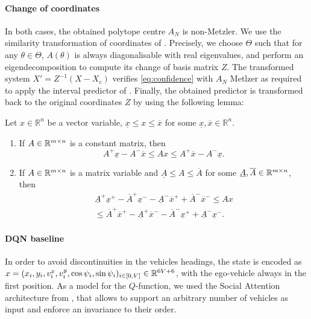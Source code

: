 \documentclass{article}
\begin{document}
\paragraph{Change of coordinates}
In both cases, the obtained polytope centre $A_N$ is non-Metzler.
We use the similarity transformation of coordinates of \citet{Efimov2013}. Precisely, we choose $\Theta$ such that for any $\theta\in\Theta$, $A(\theta)$ is always diagonalisable with real eigenvalues, and perform an eigendecomposition to compute its change of basis matrix $Z$. The transformed system $X'=Z^{-1}(X-X_c)$ verifies \eqref{eq:confidence} with $A_N$ Metlzer as required to apply the interval predictor of . Finally, the obtained predictor is transformed back to the original coordinates $Z$ by using the following lemma:
\begin{lemma}
	\label{lem:interval} Let $x\in\mathbb{R}^{n}$ be a vector variable, $\underline{x}\le x\le\overline{x}$ for some $\underline{x},\overline{x}\in\mathbb{R}^{n}$. 
	
	\begin{enumerate}
		\item If $A\in\mathbb{R}^{m\times n}$ is a constant matrix, then
		\begin{equation}
		A^{+}\underline{x}-A^{-}\overline{x}\le Ax\le A^{+}\overline{x}-A^{-}\underline{x}.\label{eq:Interval1}
		\end{equation}
		\item If $A\in\mathbb{R}^{m\times n}$ is a matrix variable and \textup{$\underline{A}\le A\le\overline{A}$} for some $\underline{A},\overline{A}\in\mathbb{R}^{m\times n}$, then
		\begin{gather}
		\underline{A}^{+}\underline{x}^{+}-\overline{A}^{+}\underline{x}^{-}-\underline{A}^{-}\overline{x}^{+}+\overline{A}^{-}\overline{x}^{-}\leq Ax\label{eq:Interval2}\\
		\leq\overline{A}^{+}\overline{x}^{+}-\underline{A}^{+}\overline{x}^{-}-\overline{A}^{-}\underline{x}^{+}+\underline{A}^{-}\underline{x}^{-}.\nonumber 
		\end{gather}
	\end{enumerate}
\end{lemma}


\paragraph{DQN baseline}

In order to avoid discontinuities in the vehicles headings, the state is encoded as $x = (x_i, y_i, v^x_i, v^y_i, \cos\psi_i, \sin\psi_i)_{i\in[0,V]}\in\mathbb{R}^{6V+6}$, with the ego-vehicle always in the first position.
As a model for the $Q$-function, we used the Social Attention architecture from \citep{leurent2019social}, that allows to support an arbitrary number of vehicles as input and enforce an invariance to their order.
\end{document}
